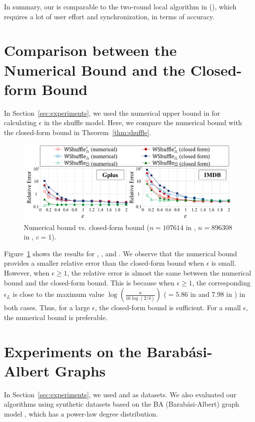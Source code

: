 In summary, our \AlgWSTriVR{} is comparable to the two-round local algorithm in \cite{Imola_USENIX22} (\AlgTwoRS{}), which requires a lot of user effort and synchronization, in terms of accuracy.

\section{Comparison between the Numerical Bound and the Closed-form Bound}
\label{sec:numerical_closed}
In Section~\ref{sec:experiments}, we used the numerical upper bound in \cite{Feldman_FOCS21} for calculating $\epsilon$ in the shuffle model.
Here, we compare the numerical bound with the closed-form bound in Theorem~\ref{thm:shuffle}.

\begin{figure}[t]
  \centering
  \includegraphics[width=0.99\linewidth]{fig/res5_closed.pdf}
  \vspace{-2mm}
  \caption{Numerical bound vs. closed-form bound ($n=107614$ in \Gplus{}, $n=896308$ in \IMDB{}, $c=1$).
  }
  \label{fig:res5_closed}
\end{figure}

Figure~\ref{fig:res5_closed} shows the results for \AlgWSTriVR{}, \AlgWSTri{}, and \AlgWSCyc{}.
We observe that the numerical bound provides a smaller relative error than the closed-form bound when $\epsilon$ is small.
However, when $\epsilon \geq 1$, the relative error is almost the same between the numerical bound and the closed-form bound.
This is because when $\epsilon \geq 1$, the corresponding $\epsilon_L$ is close to the maximum value $\log (\frac{n}{16 \log (2/\delta)})$ ($=5.86$ in \Gplus{} and $7.98$ in \IMDB{}) in both cases.
Thus, for a large $\epsilon$, the closed-form bound is sufficient.
For a small $\epsilon$, the numerical bound is preferable.

\section{Experiments on the Barab\'{a}si-Albert Graphs}
\label{sec:BA-graph}
In Section~\ref{sec:experiments}, we used \Gplus{} and \IMDB{} as datasets.
We also evaluated our algorithms using synthetic datasets based on the BA (Barab\'{a}si-Albert) graph model \cite{NetworkScience}, which has a power-law degree distribution.

